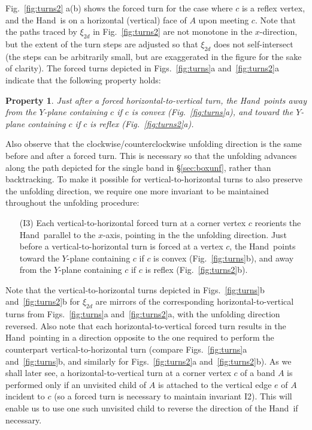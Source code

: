 \documentclass[11pt]{article}
\newcommand{\squeezelist}{\setlength{\itemsep}{0pt}}
\newtheorem{property}[theorem]{Property}
\newcommand\hand{{\sc Hand}}
\begin{document}
Fig.~\ref{fig:turns2} a(b) shows the forced turn for the case where $c$ is a reflex vertex, and the \hand\ is on a horizontal (vertical) face of $A$ upon meeting $c$. Note that the paths traced by $\xi_{2d}$ in Fig.~\ref{fig:turns2} are not monotone in the $x$-direction, but the extent of the turn steps are adjusted so that $\xi_{2d}$ does not self-intersect (the steps can be arbitrarily small, but are exaggerated in the figure for the sake of clarity).  The forced turns depicted in Figs.~\ref{fig:turns}a and~\ref{fig:turns2}a indicate that the following property holds:
\begin{property}
Just after a forced horizontal-to-vertical turn, the \hand\ points away from the $Y$-plane containing $c$ if $c$ is convex (Fig.~\ref{fig:turns}a), and toward the $Y$-plane containing $c$ if $c$ is reflex (Fig.~\ref{fig:turns2}a).
\end{property}
Also observe that the clockwise/counterclockwise unfolding direction is the same before and after a forced turn. This is necessary so that the unfolding advances along the path depicted for the single band in \S\ref{sec:boxunf}, rather than backtracking. To make it possible for vertical-to-horizontal turns to also preserve the unfolding direction, we require one more invariant to be maintained throughout the unfolding procedure:
\begin{enumerate}
\squeezelist
\item[(I3)] Each vertical-to-horizontal forced turn at a corner vertex $c$ reorients the \hand\ parallel to the $x$-axis, pointing in the the unfolding direction. Just before a vertical-to-horizontal turn is forced at a vertex $c$, the \hand\ points toward the $Y$-plane containing $c$ if $c$ is convex (Fig.~\ref{fig:turns}b), and away from the $Y$-plane containing $c$ if $c$ is reflex (Fig.~\ref{fig:turns2}b).
\end{enumerate}
Note that the vertical-to-horizontal turns depicted in Figs.~\ref{fig:turns}b and~\ref{fig:turns2}b for $\xi_{2d}$ are mirrors of the corresponding horizontal-to-vertical turns from Figs.~\ref{fig:turns}a and~\ref{fig:turns2}a, with the unfolding direction reversed. 
Also note that each horizontal-to-vertical forced turn results in the \hand\ pointing in a direction opposite to the one required to 
perform the counterpart vertical-to-horizontal turn (compare Figs.~\ref{fig:turns}a and~\ref{fig:turns}b, and similarly for 
Figs.~\ref{fig:turns2}a and~\ref{fig:turns2}b). As we shall later see,
a horizontal-to-vertical turn at a corner vertex $c$ of a band $A$ is performed only if an unvisited
child of $A$ is attached to the vertical edge $e$ of $A$ incident to $c$ (so a forced turn is necessary to maintain invariant I2). This will enable us to use one such unvisited child to reverse the direction of the \hand\, if necessary. 
\end{document}
